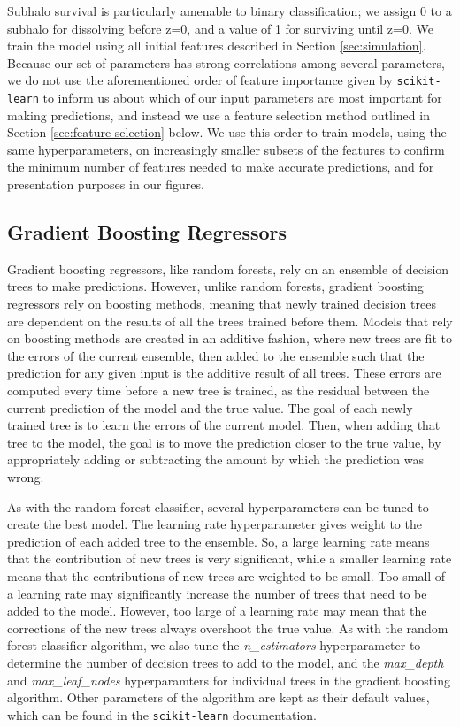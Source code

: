 \documentclass[fleqn,usenatbib]{mnras}
\begin{document}
Subhalo survival is particularly amenable to binary classification; we assign 0 to a subhalo for dissolving before z=0, and a value of 1 for surviving until z=0. We train the model using all initial features described in Section \ref{sec:simulation}. Because our set of parameters has strong correlations among several parameters, we do not use the aforementioned order of feature importance given by \texttt{scikit-learn} to inform us about which of our input parameters are most important for making predictions, and instead we use a feature selection method outlined in Section \ref{sec:feature selection} below. We use this order to train models, using the same hyperparameters, on increasingly smaller subsets of the features to confirm the minimum number of features needed to make accurate predictions, and for presentation purposes in our figures.

\subsection{Gradient Boosting Regressors}
\label{sec:gbr} %
Gradient boosting regressors, like random forests, rely on an ensemble of decision trees to make predictions. However, unlike random forests, gradient boosting regressors rely on boosting methods, meaning that newly trained decision trees are dependent on the results of all the trees trained before them. Models that rely on boosting methods are created in an additive fashion, where new trees are fit to the errors of the current ensemble, then added to the ensemble such that the prediction for any given input is the additive result of all trees. These errors are computed every time before a new tree is trained, as the residual between the current prediction of the model and the true value. The goal of each newly trained tree is to learn the errors of the current model. Then, when adding that tree to the model, the goal is to move the prediction closer to the true value, by appropriately adding or subtracting the amount by which the prediction was wrong.

As with the random forest classifier, several hyperparameters can be tuned to create the best model. The learning rate hyperparameter gives weight to the prediction of each added tree to the ensemble. So, a large learning rate means that the contribution of new trees is very significant, while a smaller learning rate means that the contributions of new trees are weighted to be small. Too small of a learning rate may significantly increase the number of trees that need to be added to the model. However, too large of a learning rate may mean that the corrections of the new trees always overshoot the true value. As with the random forest classifier algorithm, we also tune the \textit{n\_estimators} hyperparameter to determine the number of decision trees to add to the model, and the \textit{max\_depth} and \textit{max\_leaf\_nodes} hyperparamters for individual trees in the gradient boosting algorithm. Other parameters of the algorithm are kept as their default values, which can be found in the \texttt{scikit-learn} documentation.
\end{document}
